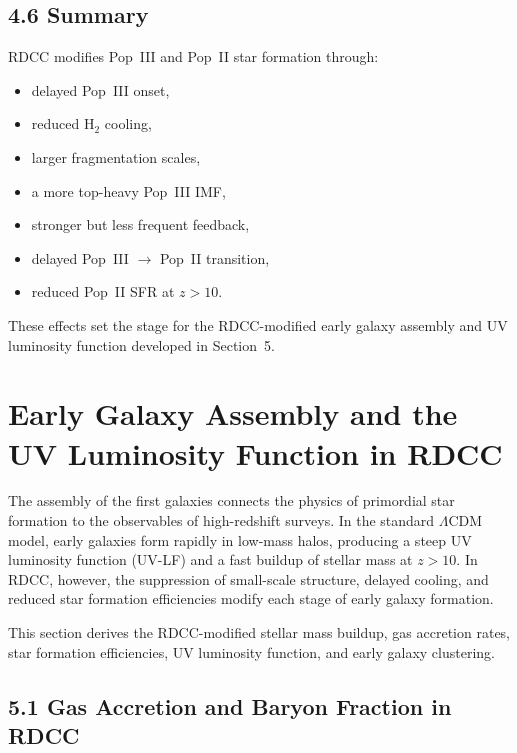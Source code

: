 \documentclass[11pt,a4paper]{article}
\begin{document}
\subsection*{4.6 Summary}

RDCC modifies Pop~III and Pop~II star formation through:

\begin{itemize}
    \item delayed Pop~III onset,
    \item reduced $\mathrm{H}_2$ cooling,
    \item larger fragmentation scales,
    \item a more top-heavy Pop~III IMF,
    \item stronger but less frequent feedback,
    \item delayed Pop~III $\rightarrow$ Pop~II transition,
    \item reduced Pop~II SFR at $z > 10$.
\end{itemize}

These effects set the stage for the RDCC-modified early galaxy assembly and UV luminosity 
function developed in Section~5.

\section{Early Galaxy Assembly and the UV Luminosity Function in RDCC}

The assembly of the first galaxies connects the physics of primordial star formation to the 
observables of high-redshift surveys. In the standard $\Lambda$CDM model, early galaxies form 
rapidly in low-mass halos, producing a steep UV luminosity function (UV-LF) and a fast buildup 
of stellar mass at $z > 10$. In RDCC, however, the suppression of small-scale structure, 
delayed cooling, and reduced star formation efficiencies modify each stage of early galaxy 
formation.

This section derives the RDCC-modified stellar mass buildup, gas accretion rates, star 
formation efficiencies, UV luminosity function, and early galaxy clustering.

\subsection*{5.1 Gas Accretion and Baryon Fraction in RDCC}
\end{document}

